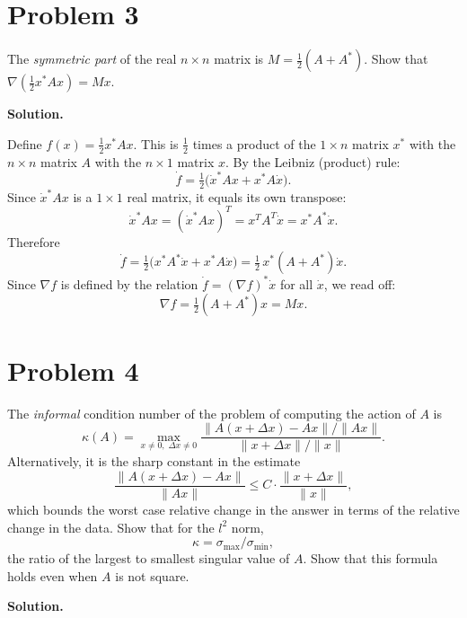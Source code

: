 \documentclass[letterpaper, 11pt]{article}
\newcommand{\1}{\mathds{1}}	%
\theoremstyle{definition}
\begin{document}
\section*{Problem 3}

The \textit{symmetric part} of the real $n \times n$ matrix is $M = \frac{1}{2}(A + A^*)$. Show that $\nabla\!\left(\frac{1}{2}x^*Ax\right) = Mx$.

\medskip

\textbf{Solution.}

Define $f(x) = \frac{1}{2}x^*Ax$. This is $\frac{1}{2}$ times a product of the $1 \times n$ matrix $x^*$ with the $n \times n$ matrix $A$ with the $n \times 1$ matrix $x$. By the Leibniz (product) rule:
\[
\dot{f} = \tfrac{1}{2}\bigl(\dot{x}^* A x + x^* A \dot{x}\bigr).
\]
Since $\dot{x}^* A x$ is a $1 \times 1$ real matrix, it equals its own transpose:
\[
\dot{x}^* A x = (\dot{x}^* A x)^T = x^T A^T \dot{x} = x^* A^* \dot{x}.
\]
Therefore
\[
\dot{f} = \tfrac{1}{2}\bigl(x^* A^* \dot{x} + x^* A \dot{x}\bigr) = \tfrac{1}{2}\,x^*(A + A^*)\dot{x}.
\]
Since $\nabla f$ is defined by the relation $\dot{f} = (\nabla f)^* \dot{x}$ for all $\dot{x}$, we read off:
\[
\nabla f = \tfrac{1}{2}(A + A^*)x = Mx.
\]
\section*{Problem 4}

The \textit{informal} condition number of the problem of computing the action of $A$ is
\[
\kappa(A) = \max_{x \neq 0,\; \Delta x \neq 0} \frac{\|A(x + \Delta x) - Ax\|/\|Ax\|}{\|x + \Delta x\|/\|x\|}.
\]
Alternatively, it is the sharp constant in the estimate
\[
\frac{\|A(x + \Delta x) - Ax\|}{\|Ax\|} \leq C \cdot \frac{\|x + \Delta x\|}{\|x\|},
\]
which bounds the worst case relative change in the answer in terms of the relative change in the data. Show that for the $l^2$ norm,
\[
\kappa = \sigma_{\max}/\sigma_{\min},
\]
the ratio of the largest to smallest singular value of $A$. Show that this formula holds even when $A$ is not square.

\medskip

\textbf{Solution.}
\end{document}

